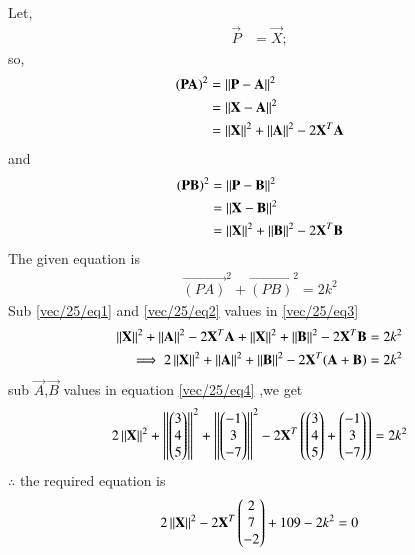 Let,
\begin{align}
 \vec P &=\vec{X};
\end{align}
 so,
 \begin{align}
 \mathbf{(PA)}^2&=\left\lVert\mathbf P-\mathbf A\right\rVert^2\\
 &=\left\lVert\mathbf X-\mathbf A\right\rVert^2\\
 &=\left\lVert\mathbf X\right\rVert^2+\left\lVert\mathbf A\right\rVert^2-2\mathbf X^T\mathbf A\label{vec/25/eq1}
 \end{align}
 and
 \begin{align}
 \mathbf{(PB)}^2&=\left\lVert\mathbf P-\mathbf B\right\rVert^2\\
 &=\left\lVert\mathbf X-\mathbf B\right\rVert^2\\
 &=\left\lVert\mathbf X\right\rVert^2+\left\lVert\mathbf B\right\rVert^2-2\mathbf X^T\mathbf B\label{vec/25/eq2}
 \end{align}
 The given equation is
\begin{align}
 \vec{(PA)}^2+ \vec{(PB)}^2 =2k^2\label{vec/25/eq3}
 \end{align}
 Sub \eqref{vec/25/eq1} and \eqref{vec/25/eq2}   values in \eqref{vec/25/eq3} 
\begin{align}
\left\lVert\mathbf X\right\rVert^2+\left\lVert\mathbf A\right\rVert^2-2\mathbf X^T\mathbf A+\left\lVert\mathbf X\right\rVert^2+\left\lVert\mathbf B\right\rVert^2-2\mathbf X^T\mathbf B=2k^2\\
\implies 2\left\lVert\mathbf X\right\rVert^2+\left\lVert\mathbf A\right\rVert^2+\left\lVert\mathbf B\right\rVert^2-2\mathbf X^T(\mathbf A+\mathbf B)=2k^2\label{vec/25/eq4} 
\end{align}
sub $\vec A$,$\vec B$ values in equation \eqref{vec/25/eq4} ,we get
\begin{align}
 2\left\lVert\mathbf X\right\rVert^2+\left\lVert\begin{pmatrix}3\\4\\5\end{pmatrix}\right\rVert^2+\left\lVert\begin{pmatrix}-1\\3\\-7\end{pmatrix}\right\rVert^2-2\mathbf X^T\left(\begin{pmatrix}3\\4\\5\end{pmatrix}+\begin{pmatrix}-1\\3\\-7\end{pmatrix}\right)=2k^2
 \end{align}
 $\therefore$ the required equation is
 \begin{align}
  2\left\lVert\mathbf X\right\rVert^2-2\mathbf X^T\begin{pmatrix}2\\7\\-2\end{pmatrix}+109-2k^2=0
\end{align}